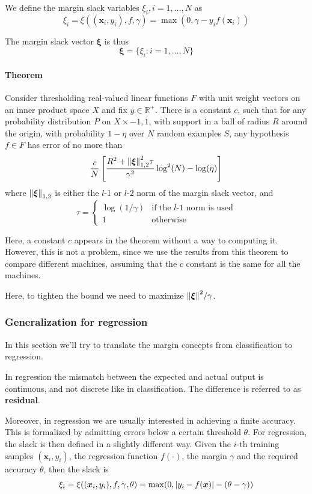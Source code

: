 \documentclass[oneside,onecolumn]{report}
\begin{document}
We define the margin slack variables $\xi_i, i = 1, \dots, N$ as
$$ \xi_i = \xi((\bm x_i, y_i), f, \gamma) = \max(0, \gamma - y_i f(\bm x_i)) $$

The margin slack vector $\bm \xi$ is thus
$$ \bm \xi = \{ \xi_i : i = 1, \dots, N \} $$

\paragraph{Theorem}
Consider thresholding real-valued linear functions $F$ with unit weight vectors on an inner product space $X$ and fix $y \in \mathbb R^+$.
There is a constant $c$, such that for any probability distribution $P$ on $X \times {-1, 1}$, with support in a ball of radius $R$ around the origin, with probability $1 - \eta$ over $N$ random examples $S$, any hypothesis $f \in F$  has error of no more than
$$ \frac{c}{N} \left[ \frac{R^2 + \norm{\bm \xi}_{1, 2}^2 \tau}{\gamma^2} \log^2(N) - \log(\eta) \right] $$
where $\norm{\bm \xi}_{1, 2}$ is either the $l$-1 or $l$-2 norm of the margin slack vector, and
$$ \tau = \begin{cases}
    \log(1 / \gamma) & \text{if the $l$-1 norm is used} \\
    1 & \text{otherwise}
\end{cases} $$

Here, a constant $c$ appears in the theorem without a way to computing it.
However, this is not a problem, since we use the results from this theorem to compare different machines, assuming that the $c$ constant is the same for all the machines.

Here, to tighten the bound we need to maximize $\norm{\bm \xi}^2 / \gamma$.

\subsubsection{Generalization for regression}
In this section we'll try to translate the margin concepts from classification to regression.

In regression the mismatch between the expected and actual output is continuous, and not discrete like in classification.
The difference is referred to as \textbf{residual}.

Moreover, in regression we are usually interested in achieving a finite accuracy.
This is formalized by admitting errors below a certain threshold $\theta$.
For regression, the slack is then defined in a slightly different way.
Given the $i$-th training samples $(\bm x_i, y_i)$, the regression function $f(\cdot)$, the margin $\gamma$ and the required accuracy $\theta$, then the slack is
$$ \xi_i = \xi((\bm x_i, y_i), f, \gamma, \theta) = \max(0, \abs{y_i - f(\bm x)} - (\theta - \gamma)) $$
\end{document}
